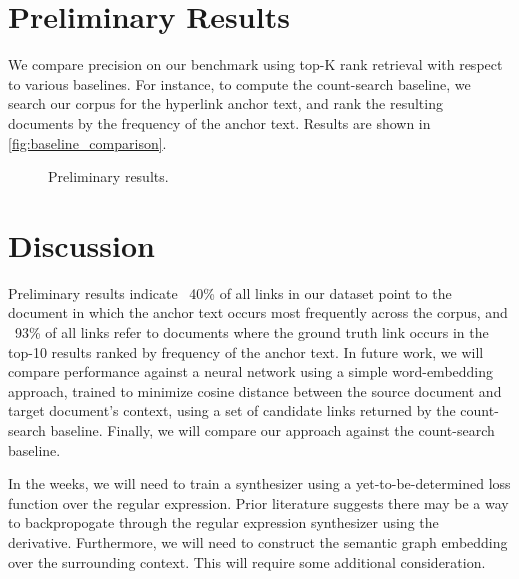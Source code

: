 \documentclass{article}
\begin{document}
\section{Preliminary Results}

We compare precision on our benchmark using top-K rank retrieval with respect to various baselines. For instance, to compute the count-search baseline, we search our corpus for the hyperlink anchor text, and rank the resulting documents by the frequency of the anchor text. Results are shown in \autoref{fig:baseline_comparison}.

\begin{figure}[H]
\centering
{}
\caption{Preliminary results.}
\label{fig:baseline_comparison}
\end{figure}

\section{Discussion}

Preliminary results indicate ~40\% of all links in our dataset point to the document in which the anchor text occurs most frequently across the corpus, and ~93\% of all links refer to documents where the ground truth link occurs in the top-10 results ranked by frequency of the anchor text. In future work, we will compare performance against a neural network using a simple word-embedding approach, trained to minimize cosine distance between the source document and target document's context, using a set of candidate links returned by the count-search baseline. Finally, we will compare our approach against the count-search baseline.

In the weeks, we will need to train a synthesizer using a yet-to-be-determined loss function over the regular expression. Prior literature suggests there may be a way to backpropogate through the regular expression synthesizer using the ~\citet{brzozowski1964derivatives} derivative. Furthermore, we will need to construct the semantic graph embedding over the surrounding context. This will require some additional consideration.

\clearpage
\newpage



\end{document}
